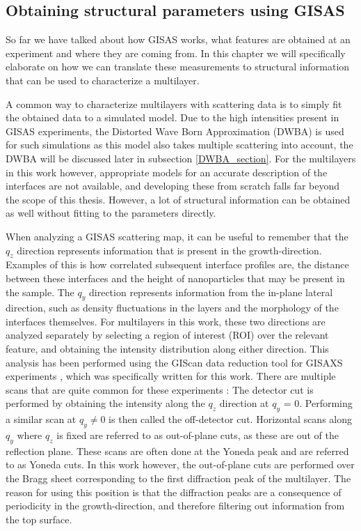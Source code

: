 \subsection{Obtaining structural parameters using GISAS}
So far we have talked about how GISAS works, what features are obtained at an experiment and where they are coming from. In this chapter we will specifically elaborate on how we can translate these measurements to structural information that can be used to characterize a multilayer.

A common way to characterize multilayers with scattering data is to simply fit the obtained data to a simulated model. Due to the high intensities present in GISAS experiments, the Distorted Wave Born Approximation (DWBA) is used for such simulations as this model also takes multiple scattering into account, the DWBA will be discussed later in subsection \ref{DWBA_section}. For the multilayers in this work however, appropriate models for an accurate description of the interfaces are not available, and developing these from scratch falls far beyond the scope of this thesis. However, a lot of structural information can be obtained as well without fitting to the parameters directly.

When analyzing a GISAS scattering map, it can be useful to remember that the $q_z$ direction represents information that is present in the growth-direction. Examples of this is how correlated subsequent interface profiles are, the distance between these interfaces and the height of nanoparticles that may be present in the sample. The $q_y$ direction represents information from the in-plane lateral direction, such as density fluctuations in the layers and the morphology of the interfaces themselves. For multilayers in this work, these two directions are analyzed separately by selecting a region of interest (ROI) over the relevant feature, and obtaining the intensity distribution along either direction. This analysis has been performed using the GIScan data reduction tool for GISAXS experiments \cite{giscan}, which was specifically written for this work. There are multiple scans that are quite common for these experiments \cite{matthias_GISAXS}: The detector cut is performed by obtaining the intensity along the $q_z$ direction at $q_y$ = 0. Performing a similar scan at $q_y \neq 0$ is then called the off-detector cut. Horizontal scans along $q_y$ where $q_z$ is fixed are referred to as out-of-plane cuts, as these are out of the reflection plane. These scans are often done at the Yoneda peak and are referred to as Yoneda cuts. In this work however, the out-of-plane cuts are performed over the Bragg sheet corresponding to the first diffraction peak of the multilayer. The reason for using this position is that the diffraction peaks are a consequence of periodicity in the growth-direction, and therefore filtering out information from the top surface.

